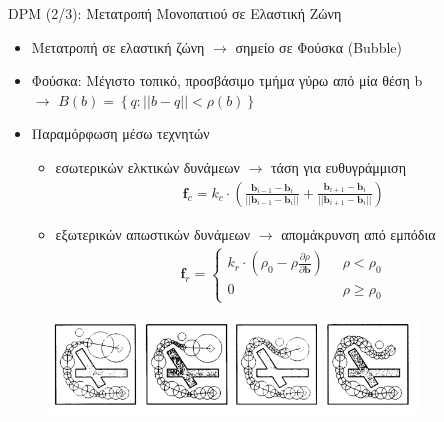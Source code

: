\documentclass[10pt, compress]{beamer}
\begin{document}
\begin{frame}{DPM (2/3): Μετατροπή Μονοπατιού σε Ελαστική Ζώνη}
	\begin{itemize}
		\item Μετατροπή σε ελαστική ζώνη $\rightarrow$ σημείο σε Φούσκα (Bubble)
		\item Φούσκα: Μέγιστο τοπικό, προσβάσιμο τμήμα γύρω από μία θέση b\\
		 $\rightarrow$ $B(b) = \left\lbrace q : ||b - q|| < \rho(b)\right\rbrace$
		\item Παραμόρφωση μέσω τεχνητών
		\begin{itemize}
			\item εσωτερικών ελκτικών δυνάμεων $\rightarrow$ τάση για ευθυγράμμιση
				\begin{align*}
					\mathbf{f}_c = k_c \cdot \left( \frac{\mathbf{b}_{i-1} - \mathbf{b}_i}{||\mathbf{b}_{i-1} - \mathbf{b}_i||} + \frac{\mathbf{b}_{i+1} - \mathbf{b}_i}{||\mathbf{b}_{i+1} - \mathbf{b}_i||}  \right)
				\end{align*}
			\item εξωτερικών απωστικών δυνάμεων $\rightarrow$ απομάκρυνση από εμπόδια
				\begin{align*}
					\mathbf{f}_r = \begin{cases}
						k_r \cdot \left(\rho_0 - \rho \frac{\partial\rho}{\partial \mathbf{b}}\right) \;\; &\rho < \rho_0\\
						0 \;\; &\rho \geq \rho_0
				 \end{cases}
			 \end{align*}
		\end{itemize}
	\end{itemize}
	
	\begin{figure}
		\includegraphics[height=2.5cm]{Figures/eband.png}
	\end{figure}
\end{frame}
\end{document}
